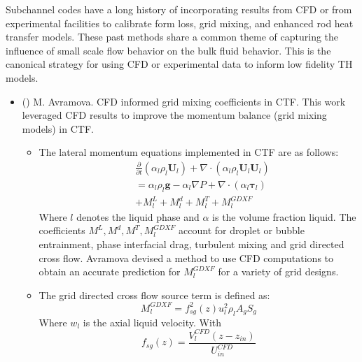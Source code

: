 
Subchannel codes have a long history of incorporating results from CFD or from experimental facilities to calibrate form loss, grid mixing, and enhanced rod heat transfer models.  These past methods share a common theme of capturing the influence of small scale flow behavior on the bulk fluid behavior.  This is the canonical strategy for using CFD or experimental data to inform low fidelity TH models.

\begin{itemize}

    \item (\checkmark) M. Avramova.  CFD informed grid mixing coefficients in CTF.  This work leveraged CFD results to improve the momentum balance (grid mixing models) in CTF. \cite{avramova2007}
    
        \begin{itemize}
        
            \item The lateral momentum equations implemented in CTF are as follows:
                \begin{align}
                    & \frac{\partial }{\partial t}(\alpha_l \rho_l \mathbf U_l)
                    + \nabla \cdot (\alpha_l \rho_l \mathbf U_l \mathbf U_l) \nonumber \\
                    &= \alpha_l \rho_l \mathbf{g} - \alpha_l \nabla P + 
                    \nabla \cdot (\alpha_l \bm{\tau}_l) \nonumber \\
                    &+ M^L_l + M^d_l + M^T_l + M_l^{GDXF}
                \end{align}
                Where $l$ denotes the liquid phase and $\alpha$ is the volume fraction liquid.  The coefficients $M^L, M^d, M^T, M_l^{GDXF}$ account for droplet or bubble entrainment, phase interfacial drag, turbulent mixing and grid directed cross flow.  Avramova devised a method to use CFD computations to obtain an accurate prediction for $M_l^{GDXF}$ for a variety of grid designs.
                
            \item The grid directed cross flow source term is defined as:
                \begin{equation}
                    M_l^{GDXF} = f^2_{sg}(z) u_l^2 \rho_l A_g S_g
                \end{equation}
                Where $w_l$ is the axial liquid velocity.
                With
                \begin{equation}
                    f_{sg}(z) = \frac{V^{CFD}_l(z-z_{in})}{U^{CFD}_{in}}
                \end{equation}
       

\end{itemize}
\end{itemize}
